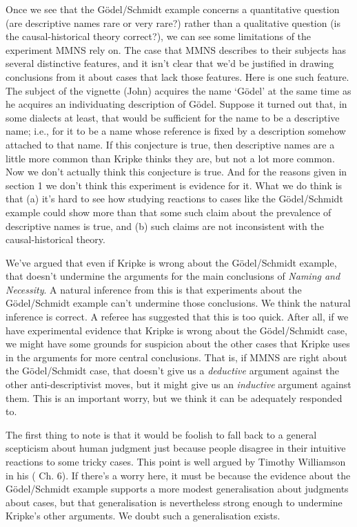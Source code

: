 \documentclass[
  10pt,
  letterpaper,
  DIV=11,
  numbers=noendperiod,
  twoside]{scrartcl}
\begin{document}
Once we see that the Gödel/Schmidt example concerns a quantitative
question (are descriptive names rare or very rare?) rather than a
qualitative question (is the causal-historical theory correct?), we can
see some limitations of the experiment MMNS rely on. The case that MMNS
describes to their subjects has several distinctive features, and it
isn't clear that we'd be justified in drawing conclusions from it about
cases that lack those features. Here is one such feature. The subject of
the vignette (John) acquires the name `Gödel' at the same time as he
acquires an individuating description of Gödel. Suppose it turned out
that, in some dialects at least, that would be sufficient for the name
to be a descriptive name; i.e., for it to be a name whose reference is
fixed by a description somehow attached to that name. If this conjecture
is true, then descriptive names are a little more common than Kripke
thinks they are, but not a lot more common. Now we don't actually think
this conjecture is true. And for the reasons given in section 1 we don't
think this experiment is evidence for it. What we do think is that (a)
it's hard to see how studying reactions to cases like the Gödel/Schmidt
example could show more than that some such claim about the prevalence
of descriptive names is true, and (b) such claims are not inconsistent
with the causal-historical theory.

We've argued that even if Kripke is wrong about the Gödel/Schmidt
example, that doesn't undermine the arguments for the main conclusions
of \emph{Naming and Necessity}. A natural inference from this is that
experiments about the Gödel/Schmidt example can't undermine those
conclusions. We think the natural inference is correct. A referee has
suggested that this is too quick. After all, if we have experimental
evidence that Kripke is wrong about the Gödel/Schmidt case, we might
have some grounds for suspicion about the other cases that Kripke uses
in the arguments for more central conclusions. That is, if MMNS are
right about the Gödel/Schmidt case, that doesn't give us a
\emph{deductive} argument against the other anti-descriptivist moves,
but it might give us an \emph{inductive} argument against them. This is
an important worry, but we think it can be adequately responded to.

The first thing to note is that it would be foolish to fall back to a
general scepticism about human judgment just because people disagree in
their intuitive reactions to some tricky cases. This point is well
argued by Timothy Williamson in his
( Ch. 6). If there's a
worry here, it must be because the evidence about the Gödel/Schmidt
example supports a more modest generalisation about judgments about
cases, but that generalisation is nevertheless strong enough to
undermine Kripke's other arguments. We doubt such a generalisation
exists.
\end{document}
